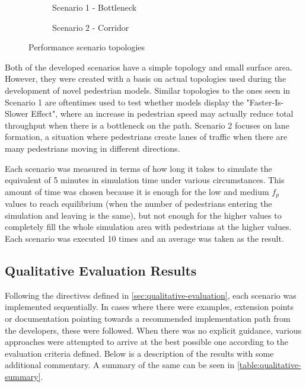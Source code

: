 \documentclass[twoside, 11pt]{article}
\begin{document}
\begin{figure}[h]
  \centering
  \begin{subfigure}{.33\textwidth}
    \centering
    
    \caption{Scenario 1 -  Bottleneck}
    \label{fig:sfig1}
  \end{subfigure}%
  \begin{subfigure}{.67\textwidth}
    \centering
    
    \caption{Scenario 2 - Corridor}
    \label{fig:sfig1}
  \end{subfigure}%
  \caption{Performance scenario topologies}
  \label{fig:performace_scenario_topologies}
\end{figure}

Both of the developed scenarios have a simple topology and small surface area. However, they were created with a basis on actual topologies used during the development of novel pedestrian models. Similar topologies to the ones seen in Scenario 1 are oftentimes used to test whether models display the "Faster-Is-Slower Effect", where an increase in pedestrian speed may actually reduce total throughput when there is a bottleneck on the path. Scenario 2 focuses on lane formation, a situation where pedestrians create lanes of traffic when there are many pedestrians moving in different directions.

Each scenario was measured in terms of how long it takes to simulate the equivalent of 5 minutes in simulation time under various circumstances. This amount of time was chosen because it is enough for the low and medium $f_p$ values to reach equilibrium (when the number of pedestrians entering the simulation and leaving is the same), but not enough for the higher values to completely fill the whole simulation area with pedestrians at the higher values. Each scenario was executed 10 times and an average was taken as the result.

\subsection{Qualitative Evaluation Results}

Following the directives defined in \autoref{sec:qualitative-evaluation}, each scenario was implemented sequentially. In cases where there were examples, extension points or documentation pointing towards a recommended implementation path from the developers, these were followed. When there was no explicit guidance, various approaches were attempted to arrive at the best possible one according to the evaluation criteria defined. Below is a description of the results with some additional commentary. A summary of the same can be seen in \autoref{table:qualitative-summary}.
\end{document}

